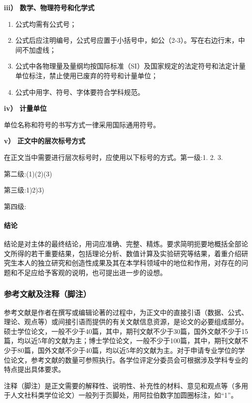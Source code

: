 {\bf iii） 数学、物理符号和化学式}

\begin{enumerate}[1)]
    \item 公式均需有公式号；
    \item 公式后应注明编号，公式号应置于小括号中，如公（2-3）。写在右边行末，中间不加虚线；
    \item 公式中各物理量及量纲均按国际标准（SI）及国家规定的法定符号和法定计量单位标注，禁止使用已废弃的符号和计量单位；
    \item 公式中用字、符号、字体要符合学科规范。
\end{enumerate}

{\bf iv） 计量单位}

单位名称和符号的书写方式一律采用国际通用符号。

{\bf v） 正文中的层次标号方式}

在正文当中需要进行层次标号时，应使用以下标号的方式。第一级:1. 2. 3.

第二级:(1)(2)(3)

第三级:1)2)3)

第四级:

\paragraph{结论}

结论是对主体的最终结论，用词应准确、完整、精炼。要求简明扼要地概括全部论文所得的若干重要结果，包括理论分析、数值计算及实验研究等结果，着重介绍研究生本人的独立研究和创造性成果及其在本学科领域中的地位和作用，对存在的问题和不足应给予客观的说明，也可提出进一步的设想。

\subsubsection{参考文献及注释（脚注）}

参考文献是作者在撰写或编辑论著的过程中，为正文中的直接引语（数据、公式、理论、观点等）或间接引语而提供的有关文献信息资源，是论文的必要组成部分。硕士学位论文，一般不少于40篇，其中，期刊文献不少于30篇，国外文献不少于15篇，均以近5年的文献为主；博士学位论文，一般不少于100篇，其中，期刊文献不少于80篇，国外文献不少于40篇，均以近5年的文献为主。对于申请专业学位的学位论文，参考文献的数量可参照执行。各学位评定分委员会可根据涉及学科专业的特点提出具体要求。

注释（脚注）是正文需要的解释性、说明性、补充性的材料、意见和观点等（多用于人文社科类学位论文）一般列于页脚处，用阿拉伯数字加圆圈标注，如“1”。


